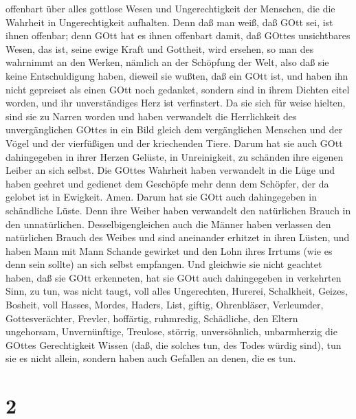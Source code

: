 offenbart über alles gottlose Wesen und Ungerechtigkeit der Menschen,
die die Wahrheit in Ungerechtigkeit aufhalten.  Denn daß
man weiß, daß GOtt sei, ist ihnen offenbar; denn GOtt hat es ihnen
offenbart  damit, daß GOttes unsichtbares Wesen, das ist,
seine ewige Kraft und Gottheit, wird ersehen, so man des wahrnimmt an
den Werken, nämlich an der Schöpfung der Welt, also daß sie keine
Entschuldigung haben,  dieweil sie wußten, daß ein GOtt
ist, und haben ihn nicht gepreiset als einen GOtt noch gedanket, sondern
sind in ihrem Dichten eitel worden, und ihr unverständiges Herz ist
verfinstert.  Da sie sich für weise hielten, sind sie zu
Narren worden  und haben verwandelt die Herrlichkeit des
unvergänglichen GOttes in ein Bild gleich dem vergänglichen Menschen und
der Vögel und der vierfüßigen und der kriechenden Tiere. 
Darum hat sie auch GOtt dahingegeben in ihrer Herzen Gelüste, in
Unreinigkeit, zu schänden ihre eigenen Leiber an sich selbst.
 Die GOttes Wahrheit haben verwandelt in die Lüge und haben
geehret und gedienet dem Geschöpfe mehr denn dem Schöpfer, der da
gelobet ist in Ewigkeit. Amen.  Darum hat sie GOtt auch
dahingegeben in schändliche Lüste. Denn ihre Weiber haben verwandelt den
natürlichen Brauch in den unnatürlichen. 
Desselbigengleichen auch die Männer haben verlassen den natürlichen
Brauch des Weibes und sind aneinander erhitzet in ihren Lüsten, und
haben Mann mit Mann Schande gewirket und den Lohn ihres Irrtums (wie es
denn sein sollte) an sich selbst empfangen.  Und gleichwie
sie nicht geachtet haben, daß sie GOtt erkenneten, hat sie GOtt auch
dahingegeben in verkehrten Sinn, zu tun, was nicht taugt, 
voll alles Ungerechten, Hurerei, Schalkheit, Geizes, Bosheit, voll
Hasses, Mordes, Haders, List, giftig, Ohrenbläser, 
Verleumder, Gottesverächter, Frevler, hoffärtig, ruhmredig, Schädliche,
den Eltern ungehorsam,  Unvernünftige, Treulose, störrig,
unversöhnlich, unbarmherzig  die GOttes Gerechtigkeit
Wissen (daß, die solches tun, des Todes würdig sind), tun sie es nicht
allein, sondern haben auch Gefallen an denen, die es tun.

\hypertarget{section-1}{%
\section{2}\label{section-1}}

